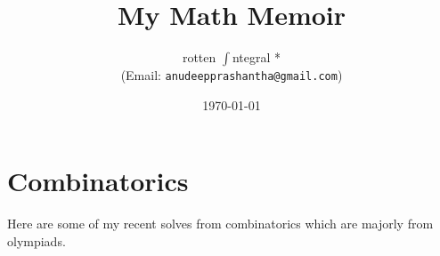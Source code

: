 \documentclass[a4paper, 11pt]{book}
\title{\textbf{My Math Memoir}}
\author{rotten $\int$ntegral *\\(Email: \texttt{anudeepprashantha@gmail.com})}
\date{\today}
\begin{document}
\maketitle
    \tableofcontents

	\chapter{Combinatorics}
	\noindent Here are some of my recent solves from combinatorics which are majorly from olympiads. 
	
	
\end{document}
